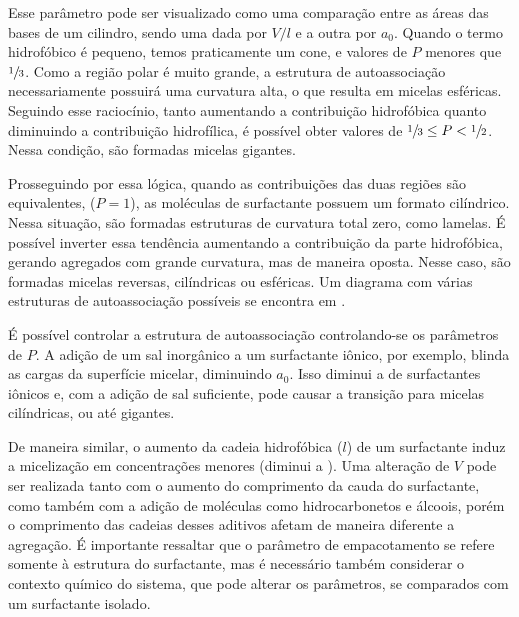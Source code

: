 	Esse parâmetro pode ser visualizado como uma comparação entre as áreas das bases de um cilindro, sendo uma dada por \({V}/{l}\) e a outra por \(a_0\). Quando o termo hidrofóbico é pequeno, temos praticamente um cone, e valores de \(P\) menores que \(\sfrac{1}{3}\). Como a região polar é muito grande, a estrutura de autoassociação necessariamente possuirá uma curvatura alta, o que resulta em micelas esféricas. Seguindo esse raciocínio, tanto aumentando a contribuição hidrofóbica quanto diminuindo a contribuição hidrofílica, é possível obter valores de \(\sfrac{1}{3} \leq P < \sfrac{1}{2}\). Nessa condição, são formadas micelas gigantes.
	
	Prosseguindo por essa lógica, quando as contribuições das duas regiões são equivalentes, (\(P = 1\)), as moléculas de surfactante possuem um formato cilíndrico. Nessa situação, são formadas estruturas de curvatura total zero, como lamelas.\cite{Zou2007} É possível inverter essa tendência aumentando a contribuição da parte hidrofóbica, gerando agregados com grande curvatura, mas de maneira oposta. Nesse caso, são formadas micelas reversas, cilíndricas\cite{Tung2006} ou esféricas\cite{Mackeben2001a}.  Um diagrama com várias estruturas de autoassociação possíveis se encontra em \citeauthor{Lindman_livro}.

	É possível controlar a estrutura de autoassociação controlando-se os parâmetros de \(P\). A adição de um sal inorgânico a um surfactante iônico, por exemplo, blinda as cargas da superfície micelar, diminuindo \(a_0\). Isso diminui a \cmc{} de surfactantes iônicos\cite{Sarac2009} e, com a adição de sal suficiente, pode causar a transição para micelas cilíndricas,\cite{Garamus2003a} ou até gigantes.\cite{Helgeson2010d} 
	
	De maneira similar, o aumento da cadeia hidrofóbica (\(l\)) de um surfactante induz a micelização em concentrações menores (diminui a \cmc).\cite{Bai2008, Sarac2017a} Uma alteração de \(V\) pode ser realizada tanto com o aumento do comprimento da cauda do surfactante, como também com a adição de moléculas como hidrocarbonetos e álcoois, porém o comprimento das cadeias desses aditivos afetam de maneira diferente a agregação.\cite{Bayer1986, Bielawska2013a, Kamada2014a} É importante ressaltar que o parâmetro de empacotamento se refere somente à estrutura do surfactante, mas é necessário também considerar o contexto químico do sistema, que pode alterar os parâmetros, se comparados com um surfactante isolado. 
	

